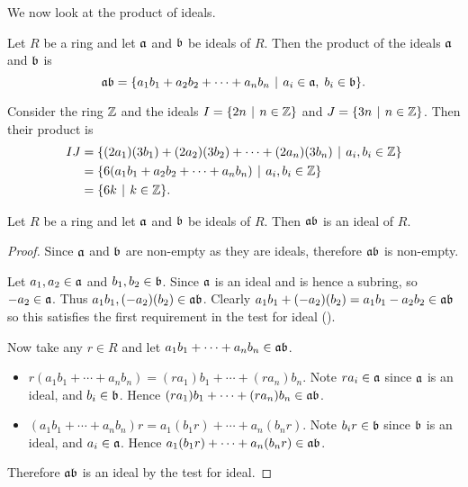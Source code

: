 We now look at the product of ideals.
\begin{definition}
    Let $R$ be a ring and let $\mathfrak{a}$ and $\mathfrak{b}$ be ideals of $R$. Then the product of the ideals $\mathfrak{a}$ and $\mathfrak{b}$ is
    \[
        \ideal{ab} = \{a_1b_1 + a_2b_2 + \cdots + a_nb_n \vert a_i\in\ideal{a},\;b_i\in\ideal{b}\}.
    \]
\end{definition}

\begin{example}
    Consider the ring $\mathbb{Z}$ and the ideals $I = \{2n \vert n \in \Z\}$ and $J = \{3n \vert n \in \Z\}$. Then their product is
    \begin{align*}
        IJ &= \{(2a_1)(3b_1) + (2a_2)(3b_2) + \cdots + (2a_n)(3b_n) \vert a_i,b_i \in \Z\}\\
        &= \{6(a_1b_1 + a_2b_2 + \cdots + a_nb_n) \vert a_i,b_i \in \Z\}\\
        &= \{6k \vert k \in \Z\}.
    \end{align*}
\end{example}

\begin{proposition}\label{prop-product-of-ideals-is-ideal}
    Let $R$ be a ring and let $\mathfrak{a}$ and $\mathfrak{b}$ be ideals of $R$. Then $\mathfrak{ab}$ is an ideal of $R$.
\end{proposition}
\begin{proof}
    Since $\mathfrak{a}$ and $\mathfrak{b}$ are non-empty as they are ideals, therefore $\mathfrak{ab}$ is non-empty.

    Let $a_1,a_2 \in \mathfrak{a}$ and $b_1,b_2 \in \mathfrak{b}$. Since $\mathfrak{a}$ is an ideal and is hence a subring, so $-a_2 \in \mathfrak{a}$. Thus $a_1b_1, (-a_2)(b_2) \in \mathfrak{ab}$. Clearly $a_1b_1 + (-a_2)(b_2) = a_1b_1 - a_2b_2 \in \mathfrak{ab}$ so this satisfies the first requirement in the test for ideal ().

    Now take any $r \in R$ and let $a_1b_1 + \cdots + a_nb_n \in \mathfrak{ab}$.
    \begin{itemize}
        \item $r(a_1b_1 + \cdots + a_nb_n) = (ra_1)b_1 + \cdots + (ra_n)b_n$. Note $ra_i \in \mathfrak{a}$ since $\mathfrak{a}$ is an ideal, and $b_i \in \mathfrak{b}$. Hence $(ra_1)b_1 + \cdots + (ra_n)b_n \in \mathfrak{ab}$.
        \item $(a_1b_1 + \cdots + a_nb_n)r = a_1(b_1r) + \cdots + a_n(b_nr)$. Note $b_ir \in \mathfrak{b}$ since $\mathfrak{b}$ is an ideal, and $a_i \in \mathfrak{a}$. Hence $a_1(b_1r) + \cdots + a_n(b_nr) \in \mathfrak{ab}$.
    \end{itemize}

    Therefore $\mathfrak{ab}$ is an ideal by the test for ideal.
\end{proof}

